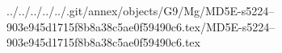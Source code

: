 ../../../../../.git/annex/objects/G9/Mg/MD5E-s5224--903e945d1715f8b8a38c5ae0f59490c6.tex/MD5E-s5224--903e945d1715f8b8a38c5ae0f59490c6.tex